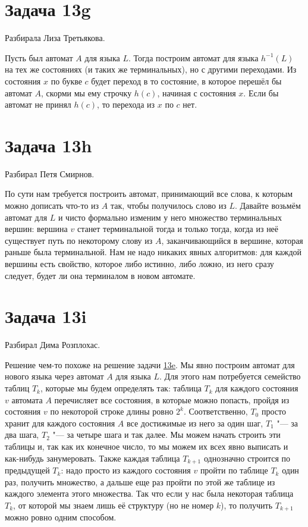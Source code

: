 \section{Задача 13g}
	Разбирала Лиза Третьякова.
	
	Пусть был автомат $A$ для языка $L$.
	Тогда построим автомат для языка $h^{-1}(L)$ на тех же состояниях (и таких же терминальных), но с другими переходами.
	Из состояния $x$ по букве $c$ будет переход в то состояние, в которое перешёл бы автомат $A$, скорми
	мы ему строчку $h(c)$, начиная с состояния $x$.
	Если бы автомат не принял $h(c)$, то перехода из $x$ по $c$ нет.

\section{Задача 13h}
	Разбирал Петя Смирнов.

	По сути нам требуется построить автомат, принимающий все слова, к которым можно дописать что-то из $A$ так, чтобы
	получилось слово из $L$.
	Давайте возьмём автомат для $L$ и чисто формально изменим у него множество терминальных вершин:
	вершина $v$ станет терминальной тогда и только тогда, когда из неё существует путь по некоторому слову из $A$,
	заканчивающийся в вершине, которая раньше была терминальной.
	Нам не надо никаких явных алгоритмов: для каждой вершины есть свойство, которое либо истинно, либо ложно, из него сразу
	следует, будет ли она терминалом в новом автомате.

\section{Задача 13i}
	Разбирал Дима Розплохас.

	Решение чем-то похоже на решение задачи \hyperref[prob13e]{13e}.
	Мы явно построим автомат для нового языка через автомат $A$ для языка $L$.
	Для этого нам потребуется семейство таблиц $T_k$, которые мы будем определять так:
	таблица $T_k$ для каждого состояния $v$ автомата $A$ перечисляет все состояния,
	в которые можно попасть, пройдя из состояния $v$ по некоторой строке длины ровно $2^k$.
	Соответственно, $T_0$ просто хранит для каждого состояния $A$ все достижимые из него за один шаг,
	$T_1$ "--- за два шага, $T_2$ "--- за четыре шага и так далее.
	Мы можем начать строить эти таблицы и, так как их конечное число, то мы можем их всех явно выписать и как-нибудь
	занумеровать.
	Также каждая таблица $T_{k+1}$ однозначно строится по предыдущей $T_k$: надо просто из каждого состояния
	$v$ пройти по таблице $T_k$ один раз, получить множество, а дальше еще раз пройти по этой же таблице из каждого элемента этого множества.
	Так что если у нас была некоторая таблица $T_k$, от которой мы знаем лишь её структуру (но не номер $k$), то получить $T_{k+1}$ можно ровно одним способом.

